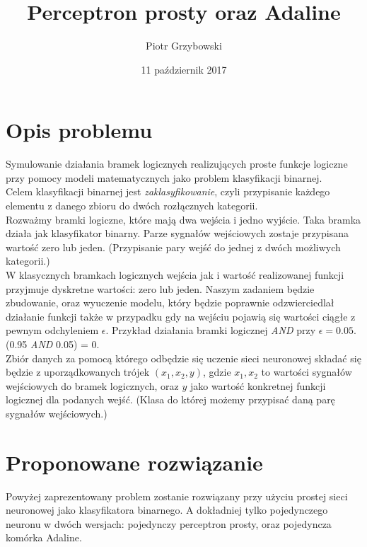 \documentclass{article}
\title{Perceptron prosty oraz Adaline}
\date{11 październik 2017}
\author{Piotr Grzybowski}
\begin{document}
 
\maketitle
\newpage

\section{Opis problemu}
    Symulowanie działania bramek logicznych realizujących proste funkcje logiczne przy pomocy modeli matematycznych jako problem klasyfikacji binarnej.\\[0.3cm]
	Celem klasyfikacji binarnej jest \textit{zaklasyfikowanie}, czyli przypisanie każdego elementu z danego zbioru do dwóch rozłącznych kategorii. \\[0.3cm]     
	Rozważmy bramki logiczne, które mają dwa wejścia i jedno wyjście. Taka bramka działa jak klasyfikator binarny. Parze sygnałów wejściowych zostaje przypisana wartość zero lub jeden. (Przypisanie pary wejść do jednej z dwóch możliwych kategorii.)\\[0.3cm]
    W klasycznych bramkach logicznych wejścia jak i wartość realizowanej funkcji przyjmuje dyskretne wartości: zero lub jeden. Naszym zadaniem będzie zbudowanie, oraz wyuczenie modelu, który będzie poprawnie odzwierciedlał działanie funkcji także w przypadku gdy na wejściu pojawią się wartości ciągłe z pewnym odchyleniem $\epsilon$. Przykład działania bramki logicznej \textit{AND} przy $\epsilon = 0.05$. (0.95 \textit{AND} 0.05) = 0. \\[0.3cm]
    Zbiór danych za pomocą którego odbędzie się uczenie sieci neuronowej składać się będzie z uporządkowanych trójek $(x_1, x_2, y)$, gdzie $x_1, x_2$ to wartości sygnałów wejściowych do bramek logicznych, oraz $y$ jako wartość konkretnej funkcji logicznej dla podanych wejść. (Klasa do której możemy przypisać daną parę sygnałów wejściowych.)
    
    
\section{Proponowane rozwiązanie}
	Powyżej zaprezentowany problem zostanie rozwiązany przy użyciu prostej sieci neuronowej jako klasyfikatora binarnego. A dokładniej tylko pojedynczego neuronu w dwóch wersjach: pojedynczy perceptron prosty, oraz pojedyncza komórka Adaline.
	
\end{document}
